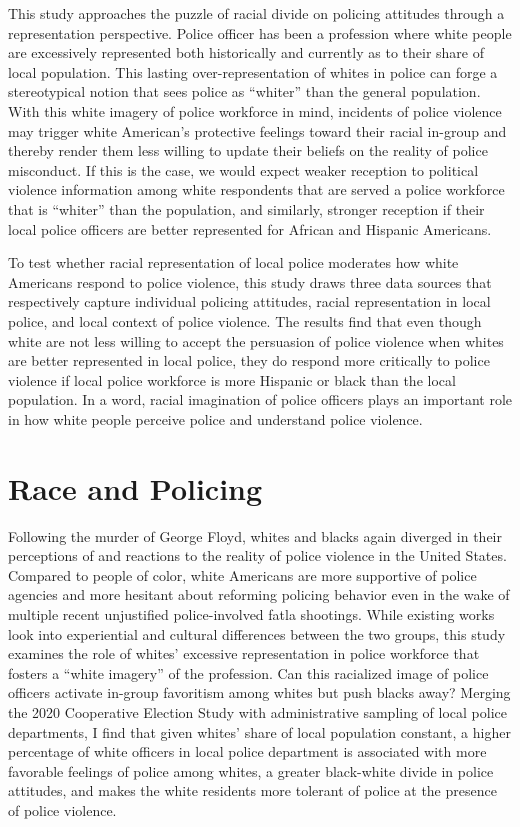 \documentclass[
  12pt,
]{article}
\begin{document}
This study approaches the puzzle of racial divide on policing attitudes
through a representation perspective. Police officer has been a
profession where white people are excessively represented both
historically and currently as to their share of local population. This
lasting over-representation of whites in police can forge a
stereotypical notion that sees police as ``whiter'' than the general
population. With this white imagery of police workforce in mind,
incidents of police violence may trigger white American's protective
feelings toward their racial in-group and thereby render them less
willing to update their beliefs on the reality of police misconduct. If
this is the case, we would expect weaker reception to political violence
information among white respondents that are served a police workforce
that is ``whiter'' than the population, and similarly, stronger
reception if their local police officers are better represented for
African and Hispanic Americans.

To test whether racial representation of local police moderates how
white Americans respond to police violence, this study draws three data
sources that respectively capture individual policing attitudes, racial
representation in local police, and local context of police violence.
The results find that even though white are not less willing to accept
the persuasion of police violence when whites are better represented in
local police, they do respond more critically to police violence if
local police workforce is more Hispanic or black than the local
population. In a word, racial imagination of police officers plays an
important role in how white people perceive police and understand police
violence.

\hypertarget{race-and-policing}{%
\section{Race and Policing}\label{race-and-policing}}

Following the murder of George Floyd, whites and blacks again diverged
in their perceptions of and reactions to the reality of police violence
in the United States. Compared to people of color, white Americans are
more supportive of police agencies and more hesitant about reforming
policing behavior even in the wake of multiple recent unjustified
police-involved fatla shootings. While existing works look into
experiential and cultural differences between the two groups, this study
examines the role of whites' excessive representation in police
workforce that fosters a ``white imagery'' of the profession. Can this
racialized image of police officers activate in-group favoritism among
whites but push blacks away? Merging the 2020 Cooperative Election Study
with administrative sampling of local police departments, I find that
given whites' share of local population constant, a higher percentage of
white officers in local police department is associated with more
favorable feelings of police among whites, a greater black-white divide
in police attitudes, and makes the white residents more tolerant of
police at the presence of police violence.
\end{document}
